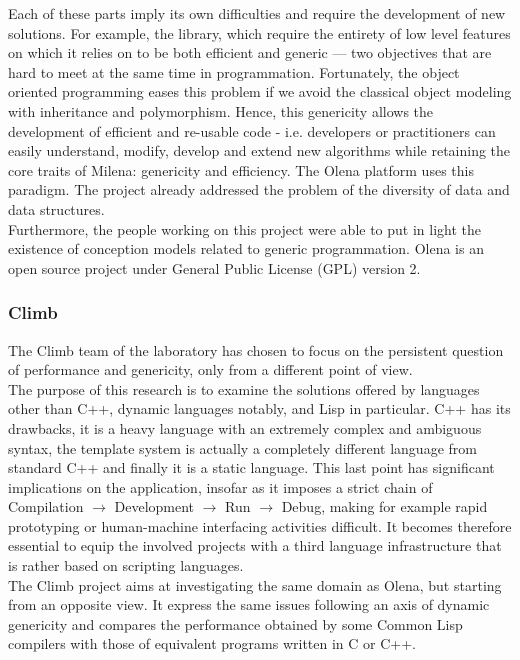 Each of these parts imply its own difficulties and require the development of new solutions.
For example, the library, which require the entirety of low level features on which it relies on to be
both efficient and generic --- two objectives that are hard to meet at the same time in programmation.
Fortunately, the object oriented programming eases this problem if we avoid the classical object
modeling with inheritance and polymorphism. Hence, this genericity allows the development of efficient
and re-usable code - i.e. developers or practitioners can easily understand, modify, develop and extend
new algorithms while retaining the core traits of Milena: genericity and efficiency.
The Olena platform uses this paradigm. The project already addressed the problem of the diversity of data
and data structures.\\

Furthermore, the people working on this project were able to put in light the existence of conception
models related to generic programmation. Olena is an open source project under General Public License (GPL)
version 2.


\subsubsection{Climb}
The Climb team of the laboratory has chosen to focus on the persistent question of performance and
genericity, only from a different point of view.\\

The purpose of this research is to examine the solutions offered by languages other than C++, dynamic
languages notably, and Lisp in particular. C++ has its drawbacks, it is a heavy language with an extremely
complex and ambiguous syntax, the template system is actually a completely different language from standard
C++ and finally it is a static language. This last point has significant implications on the application,
insofar as it imposes a strict chain of Compilation $\rightarrow$ Development $\rightarrow$ Run
$\rightarrow$ Debug, making for example rapid prototyping or human-machine interfacing activities difficult.
It becomes therefore essential to equip the involved projects with a third language infrastructure that is
rather based on scripting languages.\\

The Climb project aims at investigating the same domain as Olena, but starting from an opposite view.
It express the same issues following an axis of dynamic genericity and compares the performance obtained by
some Common Lisp compilers with those of equivalent programs written in C or C++.

